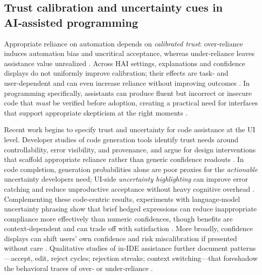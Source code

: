 \documentclass[sigconf]{acmart}
\begin{document}
\subsection{Trust calibration and uncertainty cues in AI‑assisted programming}
\label{sec:rw-trust}

Appropriate reliance on automation depends on \emph{calibrated trust}: over‑reliance induces automation bias and uncritical acceptance, whereas under‑reliance leaves assistance value unrealized \cite{parasuraman1997humans,lee2004trust,goddard2012automation}. Across HAI settings, explanations and confidence displays do not uniformly improve calibration; their effects are task‑ and user‑dependent and can even increase reliance without improving outcomes \cite{yin2019understanding,zhang2020effect,bansal2021does,vered2023effects,ma2024you}. In programming specifically, assistants can produce fluent but incorrect or insecure code that \emph{must} be verified before adoption, creating a practical need for interfaces that support appropriate skepticism at the right moments \cite{pearce2025asleep,perry2023users,asare2024user,tang2023empirical}.

Recent work begins to specify trust and uncertainty for code assistance at the UI level. Developer studies of code generation tools identify trust needs around controllability, error visibility, and provenance, and argue for design interventions that scaffold appropriate reliance rather than generic confidence readouts \cite{wang2024investigating,liang2024large}. In code completion, generation probabilities alone are poor proxies for the \emph{actionable} uncertainty developers need; UI‑side \emph{uncertainty highlighting} can improve error catching and reduce unproductive acceptance without heavy cognitive overhead \cite{vasconcelos2025generation}. Complementing these code‑centric results, experiments with language‑model uncertainty phrasing show that brief hedged expressions can reduce inappropriate compliance more effectively than numeric confidences, though benefits are context‑dependent and can trade off with satisfaction \cite{kim2024imNotSure}. More broadly, confidence displays can shift users’ own confidence and risk miscalibration if presented without care \cite{li2025confidenceAligns}. Qualitative studies of in‑IDE assistance further document patterns—accept, edit, reject cycles; rejection streaks; context switching—that foreshadow the behavioral traces of over‑ or under‑reliance \cite{jiang2024analysis}. 
\end{document}
